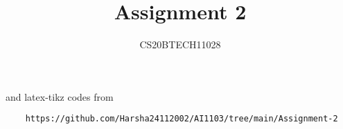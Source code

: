 \documentclass[journal,12pt,twocolumn]{IEEEtran}
\DeclareMathOperator*{\Res}{Res}
\begin{document}
\newcommand{\BEQA}{\begin{eqnarray}}
\newcommand{\EEQA}{\end{eqnarray}}
\newcommand{\define}{\stackrel{\triangle}{=}}

\raggedbottom
\setlength{\parindent}{0pt}
\providecommand{\mbf}{\mathbf}
\providecommand{\pr}[1]{\ensuremath{\Pr\left(#1\right)}}
\providecommand{\qfunc}[1]{\ensuremath{Q\left(#1\right)}}
\providecommand{\sbrak}[1]{\ensuremath{{}\left[#1\right]}}
\providecommand{\lsbrak}[1]{\ensuremath{{}\left[#1\right.}}
\providecommand{\rsbrak}[1]{\ensuremath{{}\left.#1\right]}}
\providecommand{\brak}[1]{\ensuremath{\left(#1\right)}}
\providecommand{\lbrak}[1]{\ensuremath{\left(#1\right.}}
\providecommand{\rbrak}[1]{\ensuremath{\left.#1\right)}}
\providecommand{\cbrak}[1]{\ensuremath{\left\{#1\right\}}}
\providecommand{\lcbrak}[1]{\ensuremath{\left\{#1\right.}}
\providecommand{\rcbrak}[1]{\ensuremath{\left.#1\right\}}}
\theoremstyle{remark}
\newtheorem{rem}{Remark}
\newcommand{\sgn}{\mathop{\mathrm{sgn}}}
\providecommand{\abs}[1]{\vert#1\vert}
\providecommand{\res}[1]{\Res\displaylimits_{#1}} 
\providecommand{\norm}[1]{\lVert#1\rVert}
\providecommand{\mtx}[1]{\mathbf{#1}}
\providecommand{\mean}[1]{E[ #1 ]}
\providecommand{\fourier}{\overset{\mathcal{F}}{ \rightleftharpoons}}
\providecommand{\system}{\overset{\mathcal{H}}{ \longleftrightarrow}}
\newcommand{\solution}{\noindent \textbf{Solution: }}
\newcommand{\cosec}{\,\text{cosec}\,}
\providecommand{\dec}[2]{\ensuremath{\overset{#1}{\underset{#2}{\gtrless}}}}
\newcommand{\myvec}[1]{\ensuremath{\begin{pmatrix}#1\end{pmatrix}}}
\newcommand{\mydet}[1]{\ensuremath{\begin{vmatrix}#1\end{vmatrix}}}
\makeatletter
{}
\makeatother
\let\StandardTheFigure\thefigure
\let\vec\mathbf
\renewcommand{\thefigure}{\theproblem}
\def\putbox#1#2#3{\makebox[0in][l]{\makebox[#1][l]{}\raisebox{\baselineskip}[0in][0in]{\raisebox{#2}[0in][0in]{#3}}}}
     \def\rightbox#1{\makebox[0in][r]{#1}}
     \def\centbox#1{\makebox[0in]{#1}}
     \def\topbox#1{\raisebox{-\baselineskip}[0in][0in]{#1}}
     \def\midbox#1{\raisebox{-0.5\baselineskip}[0in][0in]{#1}}
\vspace{3cm}
\title{Assignment 2}
\author{CS20BTECH11028}
\maketitle
\newpage
\bigskip
\renewcommand{\thefigure}{\theenumi}
\renewcommand{\thetable}{\theenumi}
%
and latex-tikz codes from 
%
\begin{lstlisting}
    https://github.com/Harsha24112002/AI1103/tree/main/Assignment-2
\end{lstlisting}
\end{document}
